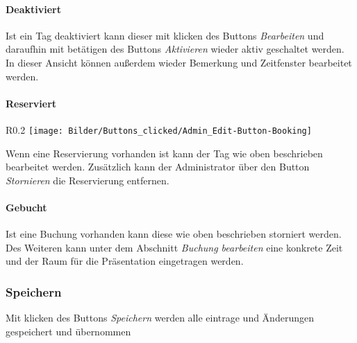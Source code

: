 \paragraph{Deaktiviert}
Ist ein Tag deaktiviert kann dieser mit klicken des Buttons \textit{Bearbeiten} und daraufhin mit betätigen des Buttons \textit{Aktivieren} wieder aktiv geschaltet werden.
In dieser Ansicht können außerdem wieder Bemerkung und Zeitfenster bearbeitet werden.
\\

\paragraph{Reserviert}
\begin{wrapfigure}{R}{0.2\textwidth}
	\centering
	\texttt{[image: Bilder/Buttons\_clicked/Admin\_Edit-Button-Booking]}
\end{wrapfigure}
Wenn eine Reservierung vorhanden ist kann der Tag wie oben beschrieben bearbeitet werden. Zusätzlich kann der Administrator über den Button \textit{Stornieren} die Reservierung entfernen.

\paragraph{Gebucht}
Ist eine Buchung vorhanden kann diese wie oben beschrieben  storniert werden. Des Weiteren kann unter dem Abschnitt \textit{Buchung bearbeiten} eine konkrete Zeit und der Raum für die Präsentation eingetragen werden.  

\subsubsection{Speichern}
Mit klicken des Buttons \textit{Speichern} werden alle eintrage und Änderungen gespeichert und übernommen 
